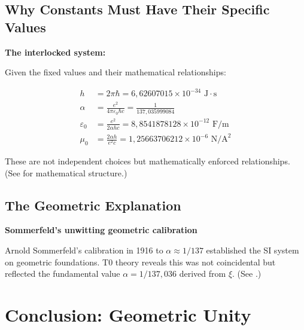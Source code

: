	\subsection{Why Constants Must Have Their Specific Values}
	
	\begin{derivation}
		\textbf{The interlocked system:}
		
		Given the fixed values and their mathematical relationships:
		
		\begin{align}
			h &= 2\pi\hbar = 6{,}62607015 \times 10^{-34} \text{ J}\cdot\text{s} \\
			\alpha &= \frac{e^2}{4\pi\varepsilon_0\hbar c} = \frac{1}{137{,}035999084} \\
			\varepsilon_0 &= \frac{e^2}{2\alpha h c} = 8{,}8541878128 \times 10^{-12} \text{ F/m} \\
			\mu_0 &= \frac{2\alpha h}{e^2 c} = 1{,}25663706212 \times 10^{-6} \text{ N/A}^2
		\end{align}
		
		These are not independent choices but mathematically enforced relationships. (See \cite{mathematical_structure_En} for mathematical structure.)
	\end{derivation}
	
	\subsection{The Geometric Explanation}
	
	\begin{historical}
		\textbf{Sommerfeld's unwitting geometric calibration}
		
		Arnold Sommerfeld's calibration in 1916 to $\alpha \approx 1/137$ established the SI system on geometric foundations. T0 theory reveals this was not coincidental but reflected the fundamental value $\alpha = 1/137{,}036$ derived from $\xi$. (See \cite{137_En}.)
	\end{historical}
	
		\section{Conclusion: Geometric Unity}
	
